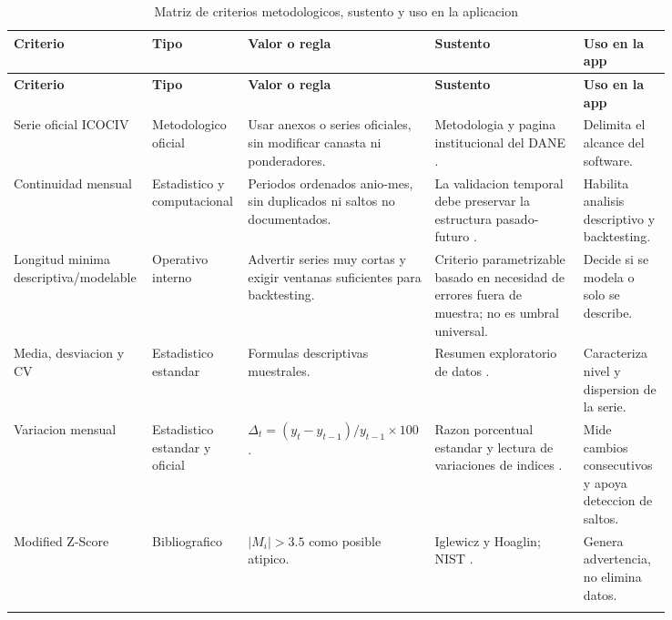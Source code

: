 ﻿\documentclass[12pt,letterpaper]{article}
\newcommand{\ICOCIV}{ICOCIV}
\begin{document}
\begingroup
\scriptsize
\setlength{\tabcolsep}{3pt}
\begin{longtable}{
>{\raggedright\arraybackslash}p{0.17\linewidth}
>{\raggedright\arraybackslash}p{0.13\linewidth}
>{\raggedright\arraybackslash}p{0.19\linewidth}
>{\raggedright\arraybackslash}p{0.22\linewidth}
>{\raggedright\arraybackslash}p{0.13\linewidth}}
\caption{Matriz de criterios metodologicos, sustento y uso en la aplicacion}
\label{tab:matriz_criterios_metodologicos}\\
\toprule
\textbf{Criterio} & \textbf{Tipo} & \textbf{Valor o regla} & \textbf{Sustento} & \textbf{Uso en la app} \\
\midrule
\endfirsthead
\toprule
\textbf{Criterio} & \textbf{Tipo} & \textbf{Valor o regla} & \textbf{Sustento} & \textbf{Uso en la app} \\
\midrule
\endhead
Serie oficial \ICOCIV{} & Metodologico oficial & Usar anexos o series oficiales, sin modificar canasta ni ponderadores. & Metodologia y pagina institucional del DANE \citep{dane2021metodologia,dane_icociv_web}. & Delimita el alcance del software. \\
\addlinespace
Continuidad mensual & Estadistico y computacional & Periodos ordenados anio-mes, sin duplicados ni saltos no documentados. & La validacion temporal debe preservar la estructura pasado-futuro \citep{tashman2000,hyndman2021fpp3}. & Habilita analisis descriptivo y backtesting. \\
\addlinespace
Longitud minima descriptiva/modelable & Operativo interno & Advertir series muy cortas y exigir ventanas suficientes para backtesting. & Criterio parametrizable basado en necesidad de errores fuera de muestra; no es umbral universal. & Decide si se modela o solo se describe. \\
\addlinespace
Media, desviacion y CV & Estadistico estandar & Formulas descriptivas muestrales. & Resumen exploratorio de datos \citep{nist_eda_summary}. & Caracteriza nivel y dispersion de la serie. \\
\addlinespace
Variacion mensual & Estadistico estandar y oficial & \(\Delta_t=(y_t-y_{t-1})/y_{t-1}\times100\). & Razon porcentual estandar y lectura de variaciones de indices \citep{dane2021metodologia}. & Mide cambios consecutivos y apoya deteccion de saltos. \\
\addlinespace
Modified Z-Score & Bibliografico & \(|M_i|>3.5\) como posible atipico. & Iglewicz y Hoaglin; NIST \citep{nist_outliers}. & Genera advertencia, no elimina datos. \\
\addlinespace

\end{longtable}
\end{document}
